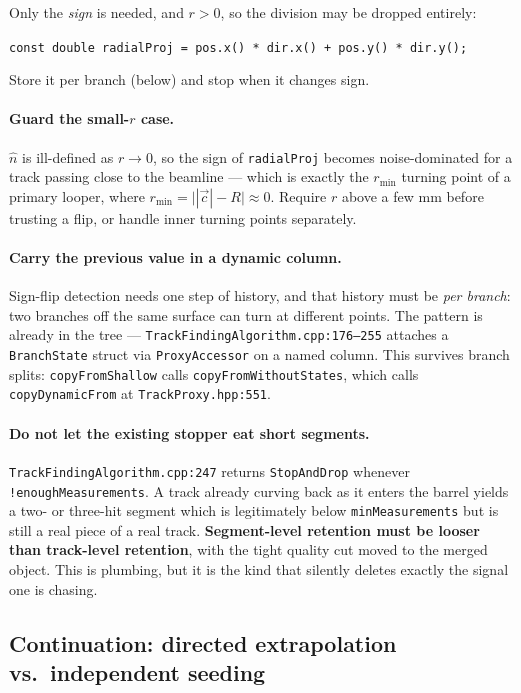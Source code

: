 \documentclass[11pt,a4paper]{article}
\newcommand{\code}[1]{\texttt{\small #1}}
\newcommand{\srcref}[2]{\code{#1:#2}}
\begin{document}
Only the \emph{sign} is needed, and $r > 0$, so the division may be dropped
entirely:
\begin{center}
\code{const double radialProj = pos.x() * dir.x() + pos.y() * dir.y();}
\end{center}
Store it per branch (below) and stop when it changes sign.

\paragraph{Guard the small-$r$ case.} $\hat{n}$ is ill-defined as $r \to 0$, so
the sign of \code{radialProj} becomes noise-dominated for a track passing close
to the beamline --- which is exactly the $r_{\min}$ turning point of a primary
looper, where $r_{\min} = \bigl||\vec c| - R\bigr| \approx 0$. Require $r$ above
a few mm before trusting a flip, or handle inner turning points separately.

\paragraph{Carry the previous value in a dynamic column.} Sign-flip detection
needs one step of history, and that history must be \emph{per branch}: two
branches off the same surface can turn at different points. The pattern is
already in the tree --- \srcref{TrackFindingAlgorithm.cpp}{176--255} attaches a
\code{BranchState} struct via \code{ProxyAccessor} on a named column. This
survives branch splits: \code{copyFromShallow} calls
\code{copyFromWithoutStates}, which calls \code{copyDynamicFrom} at
\srcref{TrackProxy.hpp}{551}.

\paragraph{Do not let the existing stopper eat short segments.}
\srcref{TrackFindingAlgorithm.cpp}{247} returns \code{StopAndDrop} whenever
\code{!enoughMeasurements}. A track already curving back as it enters the barrel
yields a two- or three-hit segment which is legitimately below
\code{minMeasurements} but is still a real piece of a real track.
\textbf{Segment-level retention must be looser than track-level retention}, with
the tight quality cut moved to the merged object. This is plumbing, but it is
the kind that silently deletes exactly the signal one is chasing.

\subsection{Continuation: directed extrapolation vs.\ independent seeding}
\label{sec:continuation}
\end{document}
